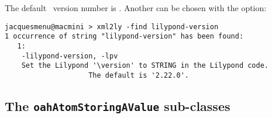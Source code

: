 The default \lily\ version number is . Another can be chosen with the  option:
\begin{lstlisting}[language=Terminal]
jacquesmenu@macmini > xml2ly -find lilypond-version
1 occurrence of string "lilypond-version" has been found:
   1:
    -lilypond-version, -lpv
    Set the Lilypond '\version' to STRING in the Lilypond code.
                    The default is '2.22.0'.
\end{lstlisting}


\subsection{The {\tt oahAtomStoringAValue} sub-classes}

